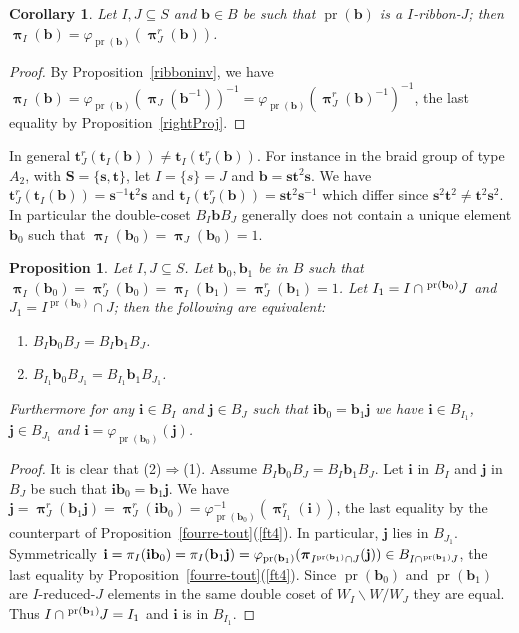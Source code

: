 \documentclass{amsart}
\numberwithin{equation}{section}
\newtheorem{proposition}[equation]{Proposition}
\newtheorem{corollary}[equation]{Corollary}
\newcommand\lexp[2]{\kern\scriptspace\vphantom{#2}^{#1}\kern-\scriptspace#2}
\newcommand\inv{^{-1}}
\newcommand\bb{{\mathbf b}}
\newcommand\bi{{\mathbf i}}
\newcommand\bj{{\mathbf j}}
\newcommand\bs{{\mathbf s}}
\newcommand\bt{{\mathbf t}}
\newcommand\bS{{\mathbf S}}
\DeclareMathOperator\pr{pr}
\DeclareMathOperator\bpi{\boldsymbol\pi}
\begin{document}
\begin{corollary} Let $I,J\subseteq S$ and $\bb\in B$ be such that
$\pr(\bb)$ is a $I$-ribbon-$J$; then
$\bpi_I(\bb)=\varphi_{\pr(\bb)}(\bpi^r_J(\bb))$.
\end{corollary}
\begin{proof}
 By Proposition~\ref{ribboninv}, we have
$\bpi_I(\bb)=\varphi_{\pr(\bb)}(\bpi_J(\bb\inv))\inv=\varphi_{\pr(\bb)}(\bpi_J^r(\bb)\inv)\inv$,
the last equality by Proposition~\ref{rightProj}. 
\end{proof}


In general $\bt^r_J(\bt_I(\bb))\ne \bt_I(\bt^r_J(\bb))$. For instance in the 
braid group of
type $A_2$,  with $\bS=\{\bs,\bt\}$, let $I=\{s\}= J$  and
$\bb=\bs\bt^2\bs$. We have $\bt^r_J(\bt_I(\bb)) = \bs\inv\bt^2\bs$  and
$\bt_I(\bt^r_J(\bb)) = \bs\bt^2\bs\inv$  which differ since $\bs^2\bt^2\neq
\bt^2\bs^2$. In particular the double-coset $B_I\bb B_J$ generally does not contain
a unique element  $\bb_0$ such that $\bpi_I(\bb_0) = \bpi_J(\bb_0) = 1$. 


\begin{proposition}\label{propdbcoset}
Let  $I,J\subseteq S$. Let $\bb_0, \bb_1$ be in $B$ such that $\bpi_I(\bb_0) =
\bpi^r_J(\bb_0)  = \bpi_I(\bb_1) = \bpi^r_J(\bb_1) = 1$. Let $I_1=I\cap\lexp{\pr(\bb_0)}J$ and
$J_1=I^{\pr(\bb_0)}\cap J$; then the following are equivalent:
\begin{enumerate}
\item $B_I\bb_0 B_J = B_I\bb_1 B_J$.
\item $B_{I_1}\bb_0 B_{J_1} = B_{I_1}\bb_1 B_{J_1}$.
\end{enumerate}
Furthermore for any $\bi\in B_I$ and  $\bj\in B_J$ such that 
$\bi\bb_0  = \bb_1\bj$ we have $\bi\in B_{I_1}$, $\bj\in B_{J_1}$
and $\bi=\varphi_{\pr(\bb_0)}(\bj)$.  
\end{proposition}
\begin{proof} It is clear that (2)$\Rightarrow$(1).
Assume $B_I\bb_0 B_J = B_I\bb_1 B_J$. Let $\bi$ in $B_I$ and
$\bj$ in $B_J$ be such  that  $\bi\bb_0  = \bb_1\bj$.  We
have $\bj=\bpi^r_J(\bb_1\bj)=\bpi^r_J(\bi\bb_0)=
\varphi\inv_{\pr(\bb_0)}(\bpi^r_{I_1}(\bi))$, the last equality by the
counterpart of Proposition~\ref{fourre-tout}(\ref{ft4}). 
In  particular, $\bj$ lies in $B_{J_1}$. Symmetrically
$\bi=\pi_I(\bi\bb_0)=\pi_I(\bb_1\bj)=\varphi_{\pr(\bb_1)}(\bpi_{I^{\pr(\bb_1)}\cap J}(\bj))\in
B_{I\cap \lexp{\pr(\bb_1)} J}$, the last equality by Proposition~\ref{fourre-tout}(\ref{ft4}). 
Since $\pr(\bb_0)$ and $\pr(\bb_1)$ are $I$-reduced-$J$ elements
in the same double coset of $W_I\backslash W/W_J$ they are equal. Thus
$I\cap \lexp {\pr(\bb_1)}J=I_1$ and $\bi$ is in $B_{I_1}$.
\end{proof}
\end{document}
